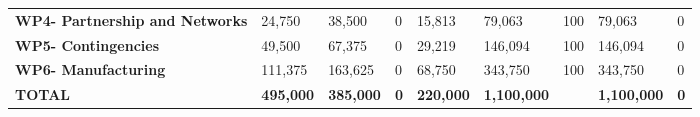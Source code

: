 \begin{table}[H]
{\begin{tabular}{p{5cm}p{2cm}p{2cm}p{2.5cm}p{2cm}p{2cm}p{2cm}p{2cm}p{2cm}}
\textbf{WP4- Partnership and Networks} & 24,750                                                                 & 38,500                                                             & 0                                                                               & 15,813                                                                       & 79,063                                                                                        & 100                          & 79,063                          & 0                                                                         \\
\textbf{WP5- Contingencies}                                                        & 49,500                                                                 & 67,375                                                             & 0                                                                               & 29,219                                                                       & 146,094                                                                                       & 100                          & 146,094                         & 0                                                                         \\
\textbf{WP6- Manufacturing}                                                        & 111,375                                                                & 163,625                                                            & 0                                                                               & 68,750                                                                       & 343,750                                                                                       & 100                          & 343,750                         & 0                                                                         \\ \hline
\textbf{TOTAL}                                                                     & \textbf{495,000}                                                       & \textbf{385,000}                                                   & \textbf{0}                                                                      & \textbf{220,000}                                                             & \textbf{1,100,000}                                                                            & \textbf{}                    & \textbf{1,100,000}              & \textbf{0}                                                               
\\ \bottomrule[2pt]
\end{tabular} }
\end{table}








